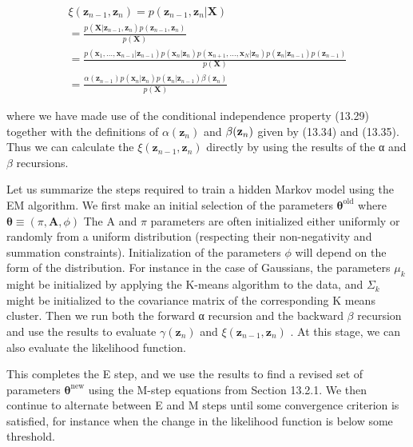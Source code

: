 \documentclass[
  10
]{article}
\begin{document}
\[
\begin{array}{l} \xi (\mathbf {z} _ {n - 1}, \mathbf {z} _ {n}) = p (\mathbf {z} _ {n - 1}, \mathbf {z} _ {n} | \mathbf {X}) \\ = \frac {p (\mathbf {X} | \mathbf {z} _ {n - 1} , \mathbf {z} _ {n}) p (\mathbf {z} _ {n - 1} , \mathbf {z} _ {n})}{p (\mathbf {X})} \\ = \frac {p (\mathbf {x} _ {1} , \dots , \mathbf {x} _ {n - 1} | \mathbf {z} _ {n - 1}) p (\mathbf {x} _ {n} | \mathbf {z} _ {n}) p (\mathbf {x} _ {n + 1} , \dots , \mathbf {x} _ {N} | \mathbf {z} _ {n}) p (\mathbf {z} _ {n} | \mathbf {z} _ {n - 1}) p (\mathbf {z} _ {n - 1})}{p (\mathbf {X})} \\ = \frac {\alpha (\mathbf {z} _ {n - 1}) p (\mathbf {x} _ {n} | \mathbf {z} _ {n}) p (\mathbf {z} _ {n} | \mathbf {z} _ {n - 1}) \beta (\mathbf {z} _ {n})}{p (\mathbf {X})} \end{array} \tag {13.43}
\]

where we have made use of the conditional independence property (13.29)
together with the definitions of \(\alpha ( { \mathbf z } _ { n } )\)
and \(\beta ( { \bf z } _ { n } )\) given by (13.34) and (13.35). Thus
we can calculate the
\(\xi ( \mathbf { z } _ { n - 1 } , \mathbf { z } _ { n } )\) directly
by using the results of the α and \(\beta\) recursions.

Let us summarize the steps required to train a hidden Markov model using
the EM algorithm. We first make an initial selection of the parameters
\(\pmb { \theta } ^ { \mathrm { o l d } }\) where
\(\pmb { \theta } \equiv ( \pi , \mathbf { A } , \phi )\) The A and
\(\pi\) parameters are often initialized either uniformly or randomly
from a uniform distribution (respecting their non-negativity and
summation constraints). Initialization of the parameters \(\phi\) will
depend on the form of the distribution. For instance in the case of
Gaussians, the parameters \(\mu _ { k }\) might be initialized by
applying the K-means algorithm to the data, and \(\Sigma _ { k }\) might
be initialized to the covariance matrix of the corresponding K means
cluster. Then we run both the forward α recursion and the backward
\(\beta\) recursion and use the results to evaluate
\(\gamma ( \mathbf { z } _ { n } )\) and
\(\xi ( \mathbf { z } _ { n - 1 } , \mathbf { z } _ { n } )\) . At this
stage, we can also evaluate the likelihood function.

This completes the E step, and we use the results to find a revised set
of parameters \(\pmb { \theta } ^ { \mathrm { n e w } }\) using the
M-step equations from Section 13.2.1. We then continue to alternate
between E and M steps until some convergence criterion is satisfied, for
instance when the change in the likelihood function is below some
threshold.
\end{document}
